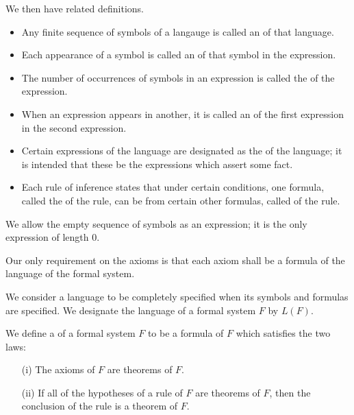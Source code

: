 We then have related definitions.
\begin{itemize}
    \item Any finite sequence of symbols of a langauge is called an  of that language.
    \item Each appearance of a symbol is called an  of that symbol in the expression.
    \item The number of occurrences of symbols in an expression is called the  of the expression.
    \item When an expression appears in another, it is called an  of the first expression in the second expression.
    \item Certain expressions of the language are designated as the  of the language; it is intended that these be the expressions which assert some fact.
    \item Each rule of inference states that under certain conditions, one formula, called the  of the rule, can be  from certain other formulas, called  of the rule.
\end{itemize}

\begin{remark}
 We allow the empty sequence of symbols as an expression;
 it is the only expression of length 0.
 \end{remark}

Our only requirement on the axioms is that each axiom shall be a formula of the language of the formal system.

We consider a language to be completely specified when its symbols and formulas are specified.
We designate the language of a formal system $F$ by $L(F)$.

\begin{shaded*}
We define a  of a formal system $F$ to be a formula of $F$ which satisfies the two laws:
\begin{enumerate}
    \item[(i)\label{axioms are theorems}] The axioms of $F$ are theorems of $F$.
    \item[(ii)\label{inductions are theorems}] If all of the hypotheses of a rule of $F$ are theorems of $F$, then the conclusion of the rule is a theorem of $F$.
\end{enumerate}
\end{shaded*}


